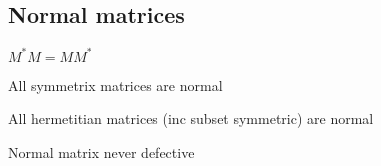 
\subsection{Normal matrices}

\(M^*M=MM^*\)

All symmetrix matrices are normal

All hermetitian matrices (inc subset symmetric) are normal

Normal matrix never defective

